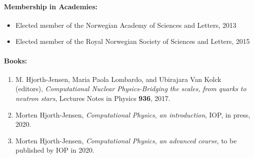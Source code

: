 \documentclass[11pt]{revtex4-1}
\begin{document}
\paragraph*{Membership in Academies:}
\begin{itemize}
\item Elected member of the Norwegian Academy of Sciences and Letters, 2013

\item Elected member of the Royal Norwegian Society of Sciences and Letters, 2015 
\end{itemize}

\paragraph*{Books:}
\begin{enumerate}

\item M. Hjorth-Jensen, Maria Paola Lombardo, and Ubirajara Van Kolck (editors), \emph{Computational Nuclear Physics-Bridging the scales, from quarks to neutron stars}, Lectures Notes in Physics {\bf 936}, 2017.

\item Morten Hjorth-Jensen, \emph{Computational Physics, an introduction}, IOP, in press, 2020.

\item Morten Hjorth-Jensen, \emph{Computational Physics, an advanced course}, to be published by IOP in 2020.



\end{enumerate}
\end{document}
